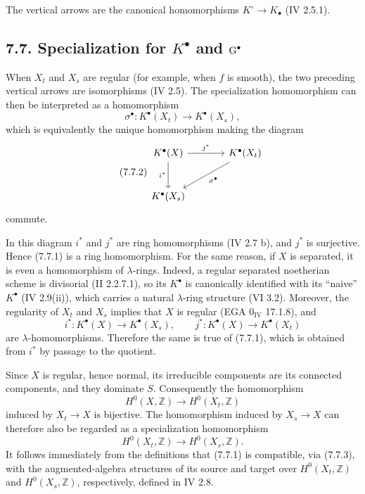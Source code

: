 The vertical arrows are the canonical homomorphisms
$K^\circ\to K_\bullet$ (IV 2.5.1).

\subsection*{7.7. Specialization for $K^\bullet$ and $\operatorname{G}^\bullet$}
When $X_t$ and $X_s$ are regular (for example, when $f$ is smooth), the two
preceding vertical arrows are isomorphisms (IV 2.5). The specialization
homomorphism can then be interpreted as a homomorphism
\begin{equation}\tag{7.7.1}
\sigma^\bullet:K^\bullet(X_t)\longrightarrow K^\bullet(X_s),
\end{equation}
which is equivalently the unique homomorphism making the diagram
\begin{equation}\tag{7.7.2}
\begin{tikzcd}[column sep=large,row sep=large]
K^\bullet(X) \arrow[r,"j^*"] \arrow[d,"i^*"'] &
K^\bullet(X_t) \arrow[dl,"\sigma^\bullet"]\\
K^\bullet(X_s) &
\end{tikzcd}
\end{equation}
commute.

In this diagram $i^*$ and $j^*$ are ring homomorphisms (IV 2.7 b), and
$j^*$ is surjective. Hence (7.7.1) is a ring homomorphism. For the same
reason, if $X$ is separated, it is even a homomorphism of $\lambda$-rings.
Indeed, a regular separated noetherian scheme is divisorial (II 2.2.7.1),
so its $K^\bullet$ is canonically identified with its ``naive''
$K^\bullet$ (IV 2.9(ii)), which carries a natural $\lambda$-ring structure
(VI 3.2). Moreover, the regularity of $X_t$ and $X_s$ implies that $X$ is
regular (EGA $0_{\mathrm{IV}}$ 17.1.8), and
\[
i^*:K^\bullet(X)\longrightarrow K^\bullet(X_s),
\qquad
j^*:K^\bullet(X)\longrightarrow K^\bullet(X_t)
\]
are $\lambda$-homomorphisms. Therefore the same is true of (7.7.1), which
is obtained from $i^*$ by passage to the quotient.

Since $X$ is regular, hence normal, its irreducible components are its
connected components, and they dominate $S$. Consequently the homomorphism
\[
H^0(X,\mathbb Z)\longrightarrow H^0(X_t,\mathbb Z)
\]
induced by $X_t\to X$ is bijective. The homomorphism induced by
$X_s\to X$ can therefore also be regarded as a specialization homomorphism
\begin{equation}\tag{7.7.3}
H^0(X_t,\mathbb Z)\longrightarrow H^0(X_s,\mathbb Z).
\end{equation}
It follows immediately from the definitions that (7.7.1) is compatible,
via (7.7.3), with the augmented-algebra structures of its source and target
over $H^0(X_t,\mathbb Z)$ and $H^0(X_s,\mathbb Z)$, respectively, defined
in IV 2.8.

